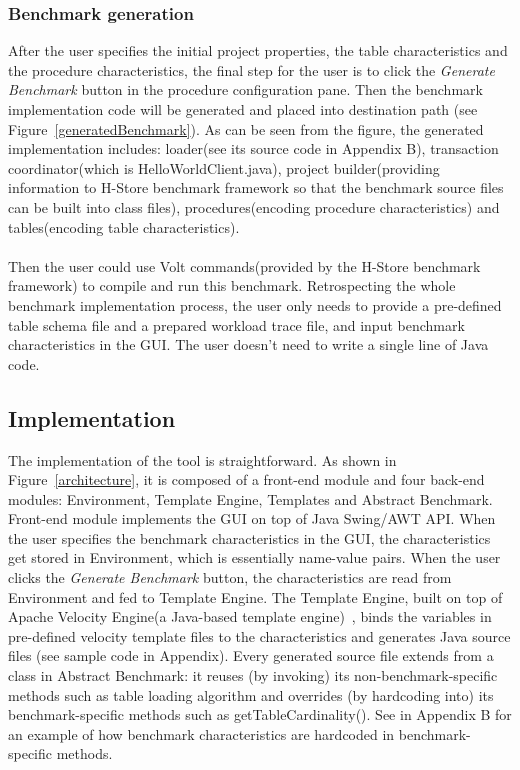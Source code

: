 \documentclass[a4paper,10pt]{article}
\begin{document}
\subsubsection{Benchmark generation}
After the user specifies the initial project properties, the table characteristics and the procedure characteristics, the final step for the user is to click the \emph{Generate Benchmark} button in the procedure configuration pane. Then the benchmark implementation code will be generated and placed into destination path (see Figure~\ref{generatedBenchmark}). As can be seen from the figure, the generated implementation includes: loader(see its source code in Appendix B), transaction coordinator(which is HelloWorldClient.java), project builder(providing information to H-Store benchmark framework so that the benchmark source files can be built into class files), procedures(encoding procedure characteristics) and tables(encoding table characteristics).
\\\\
Then the user could use Volt commands(provided by the H-Store benchmark framework) to compile and run this benchmark. Retrospecting the whole benchmark implementation process, the user only needs to provide a pre-defined table schema file and a prepared workload trace file, and input benchmark characteristics in the GUI. The user doesn't need to write a single line of Java code.

\subsection{Implementation} 
The implementation of the tool is straightforward. As shown in Figure~\ref{architecture}, it is composed of a front-end module and four back-end modules: Environment, Template Engine, Templates and Abstract Benchmark. Front-end module implements the GUI on top of Java Swing/AWT API. When the user specifies the benchmark characteristics in the GUI, the characteristics get stored in Environment, which is essentially name-value pairs. When the user clicks the \emph{Generate Benchmark} button, the characteristics are read from Environment and fed to Template Engine. The Template Engine, built on top of Apache Velocity Engine(a Java-based template engine)~\cite{velocity}, binds the variables in pre-defined velocity template files to the characteristics and generates Java source files (see sample code in Appendix). Every generated source file extends from a class in Abstract Benchmark: it reuses (by invoking) its non-benchmark-specific methods such as table loading algorithm and overrides (by hardcoding into) its benchmark-specific methods such as getTableCardinality(). See in Appendix B for an example of how benchmark characteristics are hardcoded in benchmark-specific methods.
\end{document}
